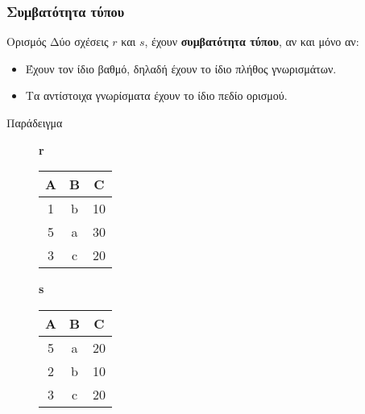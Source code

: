 \begin{frame}
\frametitle{Συμβατότητα τύπου}
\begin{minipage}{\wE}
\begin{block}{Ορισμός}
Δύο σχέσεις $r$ και $s$, έχουν \textbf{συμβατότητα τύπου}, αν και μόνο αν:
\begin{itemize}
  \item Έχουν τον ίδιο βαθμό, δηλαδή έχουν το ίδιο πλήθος γνωρισμάτων.
  \item Τα αντίστοιχα γνωρίσματα έχουν το ίδιο πεδίο ορισμού.
\end{itemize}
\end{block}
\pause
\begin{exampleblock}{Παράδειγμα}
\begin{figure}[btp]
  \centering
  \en
  \textbf{r} \vspace{0.5cm}
    \begin{tabular}{ c c c } \toprule
        {\bf A} & {\bf B} & {\bf C} \\ \midrule
        1 & b & 10 \\
        5 & a & 30 \\
        3 & c & 20 \\   \bottomrule
    \end{tabular} \phantom{nocnocnoc}
      \textbf{s}  \vspace{0.5cm}
    \begin{tabular}{ c c c } \toprule
        {\bf A} & {\bf B} & {\bf C} \\ \midrule
        5 & a & 20 \\
        2 & b & 10 \\
        3 & c & 20 \\  \bottomrule
    \end{tabular}
\end{figure}
\end{exampleblock}
\end{minipage}
\end{frame}


